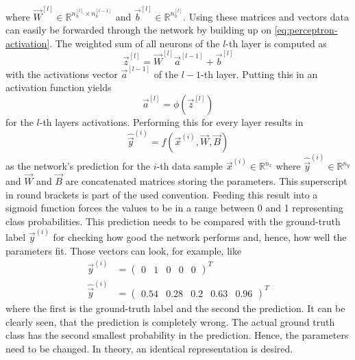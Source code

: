 where $\vec{W}^{[l]} \in \mathbb{R}^{n^{[l]}_h \times n^{[l-1]}_h}$ and $\vec{b}^{[l]} \in \mathbb{R}^{n^{[l]}_h}$.
Using these matrices and vectors data can easily be forwarded through the network by building up on \eqref{eq:perceptron-activation}.
The weighted sum of all neurons of the $l$-th layer is computed as
\begin{equation}
	\label{eq:weighted-sum}
	\vec{z}^{[l]} = \vec{W}^{[l]} \vec{a}^{[l-1]} + \vec{b}^{[l]}
\end{equation}
with the activations vector $\vec{a}^{[l-1]}$ of the $l-1$-th layer.
Putting this in an activation function yields
\begin{equation}
	\label{eq:activations}
	\vec{a}^{[l]} = \phi\left(\vec{z}^{[l]}\right)
\end{equation}
for the $l$-th layers activations.
Performing this for every layer results in 
\begin{equation}
	\label{eq:feedforward}
	\hat{\vec{y}}^{(i)} = f(\vec{x}^{(i)}, \vec{W}, \vec{B})
\end{equation}
as the network's prediction for the $i$-th data sample $\vec{x}^{(i)} \in \mathbb{R}^{n_x}$ where $\hat{\vec{y}}^{(i)} \in \mathbb{R}^{n_y}$ and $\vec{W}$ and $\vec{B}$ are concatenated matrices storing the parameters.
This superscript in round brackets is part of the used convention.
Feeding this result into a sigmoid function forces the values to be in a range between 0 and 1 representing class probabilities.
This prediction needs to be compared with the ground-truth label $\vec{y}^{(i)}$ for checking how good the network performs and, hence, how well the parameters fit.
Those vectors can look, for example, like
\begin{subequations}
	\begin{align}
		\vec{y}^{(i)} &= \begin{pmatrix} 0 & 1 & 0 & 0 & 0 \end{pmatrix}^T \\
		\hat{\vec{y}}^{(i)} &= \begin{pmatrix} 0.54 & 0.28 & 0.2 & 0.63 & 0.96 \end{pmatrix}^T
	\end{align}
\end{subequations}
where the first is the ground-truth label and the second the prediction.
It can be clearly seen, that the prediction is completely wrong.
The actual ground truth class has the second smallest probability in the prediction.
Hence, the parameters need to be changed.
In theory, an identical representation is desired.
